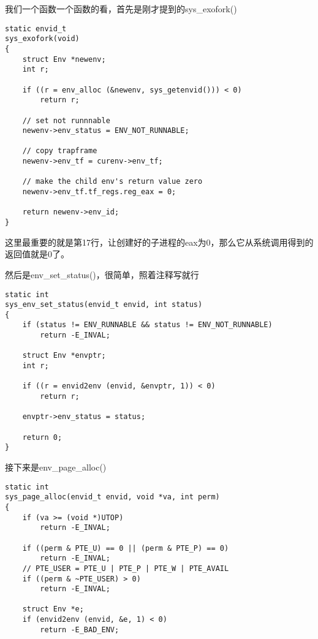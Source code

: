 \documentclass{article}
\newcommand{\funcname}[1]{{\ttfamily \small #1}}
\begin{document}
\begin{CJK*}{UTF8}{gkai}
我们一个函数一个函数的看，首先是刚才提到的\funcname{sys\_exofork()}

\begin{lstlisting}[style=ccode, title={\scriptsize \ttfamily \bfseries kern/syscall.c: sys\_exofork()}]
static envid_t
sys_exofork(void)
{
    struct Env *newenv;
    int r;

    if ((r = env_alloc (&newenv, sys_getenvid())) < 0) 
        return r;

    // set not runnnable
    newenv->env_status = ENV_NOT_RUNNABLE;

    // copy trapframe 
    newenv->env_tf = curenv->env_tf;

    // make the child env's return value zero
    newenv->env_tf.tf_regs.reg_eax = 0;

    return newenv->env_id;
}
\end{lstlisting}

这里最重要的就是第17行，让创建好的子进程的eax为0，那么它从系统调用得到的返回值就是0了。

然后是\funcname{env\_set\_status()}，很简单，照着注释写就行

\begin{lstlisting}[style=ccode, title={\scriptsize \ttfamily \bfseries kern/syscall.c: env\_set\_status()}]
static int
sys_env_set_status(envid_t envid, int status)
{
    if (status != ENV_RUNNABLE && status != ENV_NOT_RUNNABLE)
        return -E_INVAL;

    struct Env *envptr;
    int r;

    if ((r = envid2env (envid, &envptr, 1)) < 0)
        return r;

    envptr->env_status = status;

    return 0;
}
\end{lstlisting}

接下来是\funcname{env\_page\_alloc()}

\begin{lstlisting}[style=ccode, title={\scriptsize \ttfamily \bfseries kern/syscall.c: sys\_page\_alloc()}]
static int
sys_page_alloc(envid_t envid, void *va, int perm)
{
    if (va >= (void *)UTOP)
        return -E_INVAL;

    if ((perm & PTE_U) == 0 || (perm & PTE_P) == 0)
        return -E_INVAL;
    // PTE_USER = PTE_U | PTE_P | PTE_W | PTE_AVAIL
    if ((perm & ~PTE_USER) > 0)
        return -E_INVAL;

    struct Env *e;
    if (envid2env (envid, &e, 1) < 0)
        return -E_BAD_ENV;


\end{lstlisting}
\end{CJK*}
\end{document}
